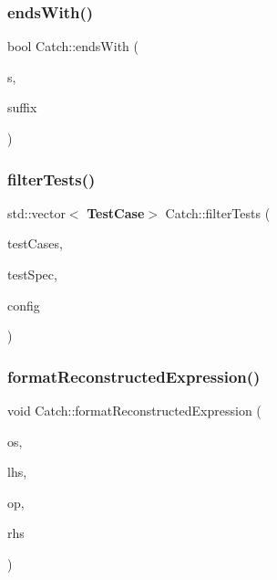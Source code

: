 \mbox{\label{namespace_catch_afd801a3e33fd7a8b91ded0d02747a93f}} 
\subsubsection{endsWith()\hspace{0.1cm}{\footnotesize\ttfamily [2/2]}}
{\footnotesize\ttfamily bool Catch\+::ends\+With (\begin{DoxyParamCaption}\item[{std\+::string const \&}]{s,  }\item[{char}]{suffix }\end{DoxyParamCaption})}

\mbox{\label{namespace_catch_ab5da9aa67c42a3f626aea07d0b556829}} 
\subsubsection{filterTests()}
{\footnotesize\ttfamily std\+::vector$<$\textbf{ Test\+Case}$>$ Catch\+::filter\+Tests (\begin{DoxyParamCaption}\item[{std\+::vector$<$ \textbf{ Test\+Case} $>$ const \&}]{test\+Cases,  }\item[{Test\+Spec const \&}]{test\+Spec,  }\item[{\textbf{ I\+Config} const \&}]{config }\end{DoxyParamCaption})}

\mbox{\label{namespace_catch_a520110c31f26cf9892595772ab814fc0}} 
\subsubsection{formatReconstructedExpression()}
{\footnotesize\ttfamily void Catch\+::format\+Reconstructed\+Expression (\begin{DoxyParamCaption}\item[{std\+::ostream \&}]{os,  }\item[{std\+::string const \&}]{lhs,  }\item[{\textbf{ String\+Ref}}]{op,  }\item[{std\+::string const \&}]{rhs }\end{DoxyParamCaption})}

